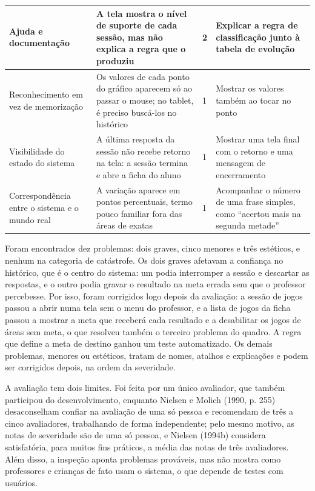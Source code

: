\begin{tabelaIFTO}
\begin{longtable}{|L{0.2891}|L{0.2661}|L{0.1549}|L{0.2899}|}
Ajuda e documentação & A tela mostra o nível de suporte de cada sessão, mas não explica a regra que o produziu & 2 & Explicar a regra de classificação junto à tabela de evolução \\ \hline
Reconhecimento em vez de memorização & Os valores de cada ponto do gráfico aparecem só ao passar o mouse; no tablet, é preciso buscá-los no histórico & 1 & Mostrar os valores também ao tocar no ponto \\ \hline
Visibilidade do estado do sistema & A última resposta da sessão não recebe retorno na tela: a sessão termina e abre a ficha do aluno & 1 & Mostrar uma tela final com o retorno e uma mensagem de encerramento \\ \hline
Correspondência entre o sistema e o mundo real & A variação aparece em pontos percentuais, termo pouco familiar fora das áreas de exatas & 1 & Acompanhar o número de uma frase simples, como “acertou mais na segunda metade” \\ \hline
\end{longtable}
\end{tabelaIFTO}

Foram encontrados dez problemas: dois graves, cinco menores e três estéticos, e nenhum na categoria de catástrofe. Os dois graves afetavam a confiança no histórico, que é o centro do sistema: um podia interromper a sessão e descartar as respostas, e o outro podia gravar o resultado na meta errada sem que o professor percebesse. Por isso, foram corrigidos logo depois da avaliação: a sessão de jogos passou a abrir numa tela sem o menu do professor, e a lista de jogos da ficha passou a mostrar a meta que receberá cada resultado e a desabilitar os jogos de áreas sem meta, o que resolveu também o terceiro problema do quadro. A regra que define a meta de destino ganhou um teste automatizado. Os demais problemas, menores ou estéticos, tratam de nomes, atalhos e explicações e podem ser corrigidos depois, na ordem da severidade.

A avaliação tem dois limites. Foi feita por um único avaliador, que também participou do desenvolvimento, enquanto Nielsen e Molich (1990, p. 255) desaconselham confiar na avaliação de uma só pessoa e recomendam de três a cinco avaliadores, trabalhando de forma independente; pelo mesmo motivo, as notas de severidade são de uma só pessoa, e Nielsen (1994b) considera satisfatória, para muitos fins práticos, a média das notas de três avaliadores. Além disso, a inspeção aponta problemas prováveis, mas não mostra como professores e crianças de fato usam o sistema, o que depende de testes com usuários.

